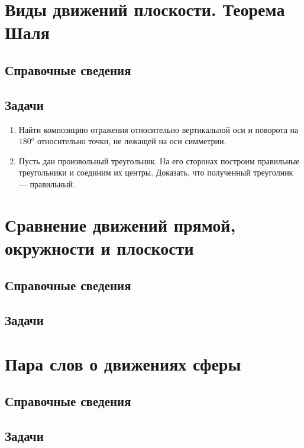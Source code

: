 \section{Виды движений плоскости. Теорема Шаля}

\subsection*{Справочные сведения}

\subsection*{Задачи}


\begin{enumerate}
\item Найти композицию отражения относительно вертикальной оси и поворота на $180^o$ относительно точки, не лежащей на оси симметрии.
\item Пусть дан произвольный треугольник. На его сторонах построим правильные треугольники и соединим их центры. Доказать, что полученный треуголник --- правильный.
\end{enumerate}


\section{Сравнение движений прямой, окружности и плоскости}

\subsection*{Справочные сведения}

\subsection*{Задачи}




\section{Пара слов о движениях сферы}

\subsection*{Справочные сведения}

\subsection*{Задачи}

